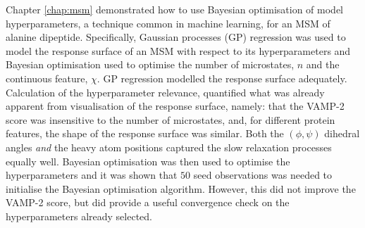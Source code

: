Chapter \ref{chap:msm} demonstrated how to use Bayesian optimisation of model hyperparameters, a technique common in machine learning, for an MSM of alanine dipeptide. Specifically, Gaussian processes (GP) regression was used to model the response surface of an MSM with respect to its hyperparameters and Bayesian optimisation used to optimise the number of microstates, $n$ and the continuous feature, $\chi$. GP regression modelled the response surface adequately. Calculation of the hyperparameter relevance, quantified what was already apparent from visualisation of the response surface, namely: that the VAMP-2 score was insensitive to the number of microstates, and, for different protein features, the shape of the response surface was similar.  Both the $(\phi, \psi)$ dihedral angles \emph{and} the heavy atom positions captured the slow relaxation processes equally well. Bayesian optimisation was then used to optimise the hyperparameters and it was shown that $50$ seed observations was needed to initialise the Bayesian optimisation algorithm. However, this did not improve the VAMP-2 score, but did provide a useful convergence check on the hyperparameters already selected. 

